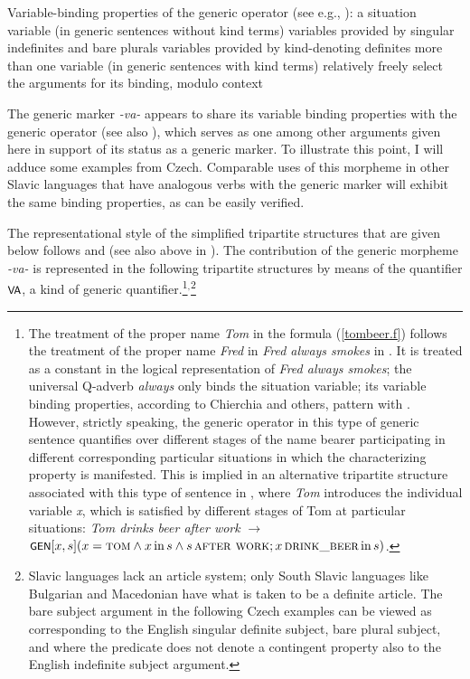 \documentclass[output=paper,colorlinks,citecolor=brown]{langscibook}
\begin{document}
\ea \label{varbindingGen} Variable-binding properties of the  generic operator  (see e.g., \citealt{chierchia1995}):
\ea a situation variable (in generic sentences without kind terms)
\ex variables provided by singular indefinites and bare plurals
\ex variables provided by kind-denoting definites
\ex more than one variable (in generic sentences with kind terms)
\ex	 relatively freely select the arguments for its binding, modulo context
\z
\z

\noindent
The generic marker \textit{-va-} appears to
share its variable binding properties with the generic operator  (see also \citealt{filip2009parisva,filip2021cologneva}),
which serves as one among other arguments given here in support
of its status as a generic marker.
To illustrate this point, I will adduce some examples  from Czech.
Comparable uses of this morpheme in other Slavic languages that
have analogous verbs with the generic marker will exhibit the same binding properties, as can be easily verified.

\largerpage[2]
The representational style of the simplified tripartite structures that are given below follows \citet{krifka1995genericity} and \citet{pelletier1997generics} (see also above in ). The contribution of the generic morpheme \textit{-va-} is
represented in the following tripartite structures
by means of the quantifier $\cnst{va}$, a kind of generic quantifier.\footnote{The treatment of the proper name \textit{Tom} in the formula (\ref{tombeer.f}) follows the treatment of the proper name \textit{Fred} in
\textit{Fred always smokes} in \citet [189, ex. (37)]{chierchia1995}.  It is treated as a constant in the logical representation of \textit{Fred always smokes}; the universal Q-adverb \textit{always} only binds the situation variable; its
variable binding properties, according to Chierchia and others,
pattern with . However, strictly speaking, the generic operator  in this type of generic
sentence quantifies over different stages of the name bearer
participating in different corresponding particular situations in which
the characterizing property is manifested. This is implied in an alternative tripartite structure associated with this type of sentence in
\citet{krifka1995genericity}, where \textit{Tom} introduces the individual variable \textit{x}, which is satisfied by different stages of Tom at particular situations: \textit{Tom drinks beer after work} $\rightarrow$ $\cnst{Gen}[x,s] (x = \textsc{tom}  \wedge x\, \textrm{in}\, s   \wedge s\, \textsc{after work};
x \, \textsc{drink\_beer}\, \textrm{in}\, s)$.}$^,$\footnote{Slavic languages lack an article system; only South Slavic languages like Bulgarian and Macedonian have
what is taken to be a definite article. The bare subject argument in the following Czech examples can be viewed as corresponding to the English singular definite subject, bare plural subject, and where the predicate does not denote a contingent property also to the English indefinite subject argument.}
\end{document}
